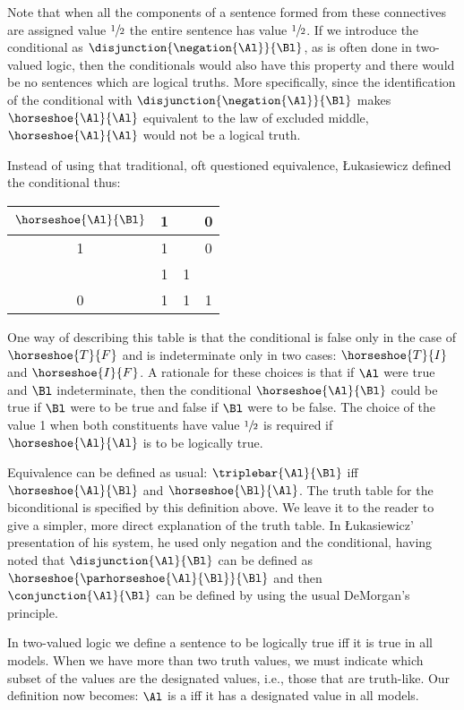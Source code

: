Note that when all the components of a sentence formed from these connectives are assigned value $\sfrac{1}{2}$ the entire sentence has value $\sfrac{1}{2}$. 
If we introduce the conditional as $\disjunction{\negation{\Al}}{\Bl}$, as is often done in two-valued logic, then the conditionals would also have this property and there would be no sentences which are logical truths. 
More specifically, since the identification of the conditional with $\disjunction{\negation{\Al}}{\Bl}$ makes $\horseshoe{\Al}{\Al}$ equivalent to the law of excluded middle, $\horseshoe{\Al}{\Al}$ would not be a logical truth. 

Instead of using that traditional, oft questioned equivalence, \L{}ukasiewicz defined the conditional thus:
\begin{center}
	\begin{tabular}{ | c | c | c | c |}
		\hline
		$\horseshoe{\Al}{\Bl}$ & 1 & \textonehalf{} & 0 \\ \hline
		1 & 1 & \textonehalf{} & 0 \\ \hline
		\textonehalf{} & 1 & 1 & \textonehalf{} \\ \hline
		0 & 1 & 1 & 1 \\ \hline
	\end{tabular}		
\end{center}
One way of describing this table is that the conditional is false only in the case of $\horseshoe{T}{F}$ and is indeterminate only in two cases: $\horseshoe{T}{I}$ and $\horseshoe{I}{F}$. 
A rationale for these choices is that if $\Al$ were true and $\Bl$ indeterminate, then the conditional $\horseshoe{\Al}{\Bl}$ could be true if $\Bl$ were to be true and false if $\Bl$ were to be false. 
The choice of the value 1 when both constituents have value $\sfrac{1}{2}$ is required if $\horseshoe{\Al}{\Al}$ is to be logically true. 

Equivalence can be defined as usual: $\triplebar{\Al}{\Bl}$ iff $\horseshoe{\Al}{\Bl}$ and $\horseshoe{\Bl}{\Al}$.  
The truth table for the biconditional is specified by this definition above. 
We leave it to the reader to give a simpler, more direct explanation of the truth table.
In \L{}ukasiewicz' presentation of his system, he used only negation and the conditional, having noted that $\disjunction{\Al}{\Bl}$ can be defined as $\horseshoe{\parhorseshoe{\Al}{\Bl}}{\Bl}$ and then $\conjunction{\Al}{\Bl}$ can be defined by using the usual DeMorgan's principle.

In two-valued logic we define a sentence to be logically true iff it is true in all models. 
When we have more than two truth values, we must indicate which subset of the values are the designated values, i.e., those that are truth-like. 
Our definition now becomes: $\Al$ is a  iff it has a designated value in all models. 

